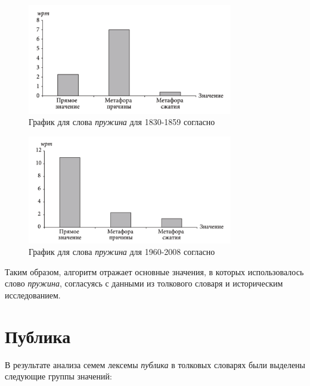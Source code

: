 \noindent %
\begin{figure}[H]
    \centering %
    \includegraphics[width=0.8\textwidth]{img/book/pruzhina/1830-1859}
    \caption{График для слова \textit{пружина} для 1830-1859 согласно~\cite{TwoCenturies}}
\end{figure}

\begin{figure}[H]
    \centering %
    \includegraphics[width=0.8\textwidth]{img/book/pruzhina/1960-2008}
    \caption{График для слова \textit{пружина} для 1960-2008 согласно~\cite{TwoCenturies}}
\end{figure}

Таким образом, алгоритм отражает основные значения, в которых использовалось
слово \textit{пружина}, согласуясь с данными из толкового словаря и историческим исследованием.

\section*{Публика}

В результате анализа семем лексемы \textit{публика} в толковых словарях были выделены следующие группы значений:

